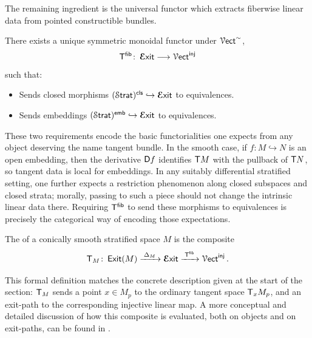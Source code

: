 The remaining ingredient is the universal functor which extracts fiberwise linear data from pointed constructible bundles.
\begin{theorem}\label{ch4:: def: cbl tgt bundle}\cite[Proposition~2.15]{AFR2}
    There exists a unique symmetric monoidal functor under $\operatorname{\mathcal V{\sf ect}}^{\sim}$,
    \begin{equation}
        \mathsf T^{\sf fib}\colon \operatorname{\boldsymbol{\mathcal E}{\sf xit}} \longrightarrow \operatorname{\mathcal V{\sf ect}}^{\operatorname{\mathsf{inj}}}
    \end{equation}
    such that:
    \begin{itemize}
        \item \label{closed-morphism} Sends closed morphisms $(\operatorname{\mathcal S\mathsf{trat}})^{\operatorname{\mathsf{cls}}} \hookrightarrow \operatorname{\boldsymbol{\mathcal E}{\sf xit}}$ to equivalences.
        \item \label{embeddings} Sends embeddings $(\operatorname{\mathcal S\mathsf{trat}})^{\operatorname{\mathsf{emb}}} \hookrightarrow \operatorname{\boldsymbol{\mathcal E}{\sf xit}}$ to equivalences.
    \end{itemize}
\end{theorem}

These two requirements encode the basic functorialities one expects from any object deserving the name tangent bundle. In the smooth case, if \(f\colon M \hookrightarrow N\) is an open embedding, then the derivative $\mathsf D f$ identifies \(\mathsf T M\) with the pullback of \(\mathsf T N\), so tangent data is local for embeddings. In any suitably differential stratified setting, one further expects a restriction phenomenon along closed subspaces and closed strata; morally, passing to such a piece should not change the intrinsic linear data there. Requiring \(\mathsf T^{\sf fib}\) to send these morphisms to equivalences is precisely the categorical way of encoding those expectations.

\begin{definition}
    The  of a conically smooth stratified space $M$ is the composite
    \begin{equation}
        \mathsf T_M \colon \operatorname{\sf Exit}(M) \xrightarrow{\;\Delta_M\;} \operatorname{\boldsymbol{\mathcal E}{\sf xit}} \xrightarrow{\;\mathsf T^{\sf fib}\;} \operatorname{\mathcal V{\sf ect}}^{\operatorname{\mathsf{inj}}}.
    \end{equation}
\end{definition}

This formal definition matches the concrete description given at the start of the section: $\mathsf T_M$ sends a point $x\in M_p$ to the ordinary tangent space $\mathsf T_xM_p$, and an exit-path to the corresponding injective linear map. A more conceptual and detailed discussion of how this composite is evaluated, both on objects and on exit-paths, can be found in \cite[Section~2]{AFR2}.


